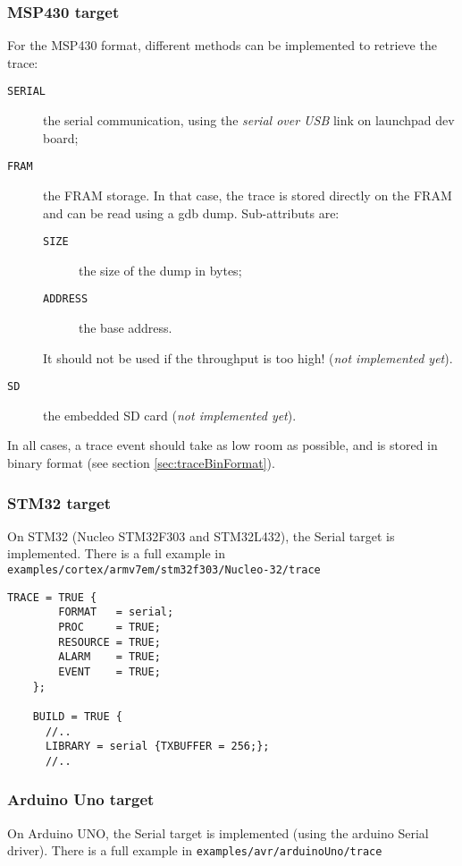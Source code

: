 \subsubsection{MSP430 target}
For the MSP430 format, different methods can be implemented to retrieve the trace:
\begin{description}
	\item[\texttt{SERIAL}] the serial communication, using the \emph{serial over USB} link on launchpad dev board;
	\item[\texttt{FRAM}] the FRAM storage. In that case, the trace is stored directly on the FRAM and can be read using a gdb dump. Sub-attributs are:
\begin{description}
	\item[\texttt{SIZE}] the size of the dump in bytes;
	\item[\texttt{ADDRESS}] the base address.
\end{description} It should not be used if the throughput is too high!
(\emph{not implemented yet}).

	\item[\texttt{SD}] the embedded SD card (\emph{not implemented yet}).
\end{description}

In all cases, a trace event should take as low room as possible, and is stored in binary format (see section \ref{sec:traceBinFormat}).

\subsubsection{STM32 target}
On STM32 (Nucleo STM32F303 and STM32L432), the Serial target is implemented. There is a full example in \texttt{examples/cortex/armv7em/stm32f303/Nucleo-32/trace}

\begin{lstlisting}[language=OIL]
    TRACE = TRUE {
        FORMAT   = serial;
        PROC     = TRUE;
        RESOURCE = TRUE;
        ALARM    = TRUE;
        EVENT    = TRUE;
    };
    
    BUILD = TRUE {
	  //..
      LIBRARY = serial {TXBUFFER = 256;};
	  //..

\end{lstlisting}

\subsubsection{Arduino Uno target}
On Arduino UNO, the Serial target is implemented (using the arduino Serial driver).
There is a full example in \texttt{examples/avr/arduinoUno/trace}

